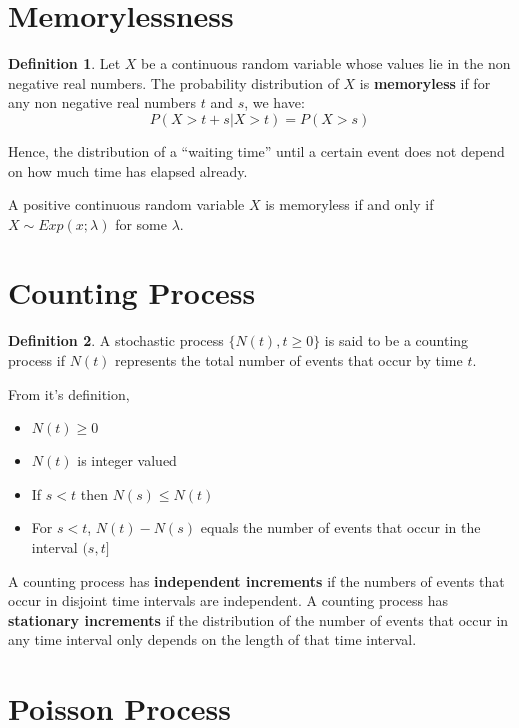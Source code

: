 \documentclass[12pt,letterpaper]{amsbook}
\theoremstyle{definition}
\newtheorem{definition}{Definition}%
\begin{document}
\section{Memorylessness}

\begin{definition}
Let $X$ be a continuous random variable whose values lie in the non negative real numbers. The probability distribution of $X$ is \textbf{memoryless} if for any non negative real numbers $t$ and $s$, we have:
\[P(X>t + s | X > t) = P(X>s)\]
\end{definition}

Hence, the distribution of a ``waiting time'' until a certain event does not depend on how much time has elapsed already.

\begin{theorem}
  A positive continuous random variable $X$ is memoryless if and only if $X \sim Exp(x;\lambda)$ for some $\lambda$.
\end{theorem}

\section{Counting Process}

\begin{definition}
A stochastic process $\{N(t),t \geq 0\}$ is said to be a counting process if $N(t)$ represents the total number of events that occur by time $t$.  
\end{definition}

From it's definition, 
\begin{itemize}
  \item $N(t) \geq 0$
  \item $N(t)$ is integer valued
  \item If $s < t$ then $N(s) \leq N(t)$
  \item For $s < t$, $N(t)-N(s)$ equals the number of events that occur in the interval $(s,t]$
\end{itemize}

A counting process has \textbf{independent increments}  if the numbers of events that occur in disjoint time intervals are independent. A counting process has \textbf{stationary increments} if the distribution of the number of events that occur in any time interval only depends on the length of that time interval.

\section{Poisson Process}
\end{document}
